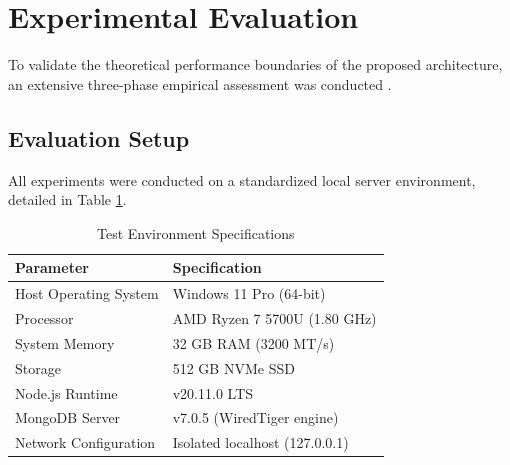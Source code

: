 \documentclass[conference]{IEEEtran}
\begin{document}
\begin{table}[htbp]
\caption{Role-Based Access Control (RBAC) Permission Matrix}
\begin{center}
\label{tab:rbac_matrix}
\end{center}
\end{table}


\section{Experimental Evaluation}

To validate the theoretical performance boundaries of the proposed architecture, an extensive three-phase empirical assessment was conducted \cite{wohlin2012threats}. 

\subsection{Evaluation Setup}



All experiments were conducted on a standardized local server environment, detailed in Table \ref{tab:hardware}.

\begin{table}[htbp]
\caption{Test Environment Specifications}
\begin{center}
\begin{tabular}{ll}
\toprule
\textbf{Parameter} & \textbf{Specification} \\
\midrule
Host Operating System & Windows 11 Pro (64-bit) \\
Processor & AMD Ryzen 7 5700U (1.80 GHz) \\
System Memory & 32 GB RAM (3200 MT/s) \\
Storage & 512 GB NVMe SSD \\
Node.js Runtime & v20.11.0 LTS \\
MongoDB Server & v7.0.5 (WiredTiger engine) \\
Network Configuration & Isolated localhost (127.0.0.1) \\
\bottomrule
\end{tabular}
\label{tab:hardware}
\end{center}
\end{table}
\end{document}

